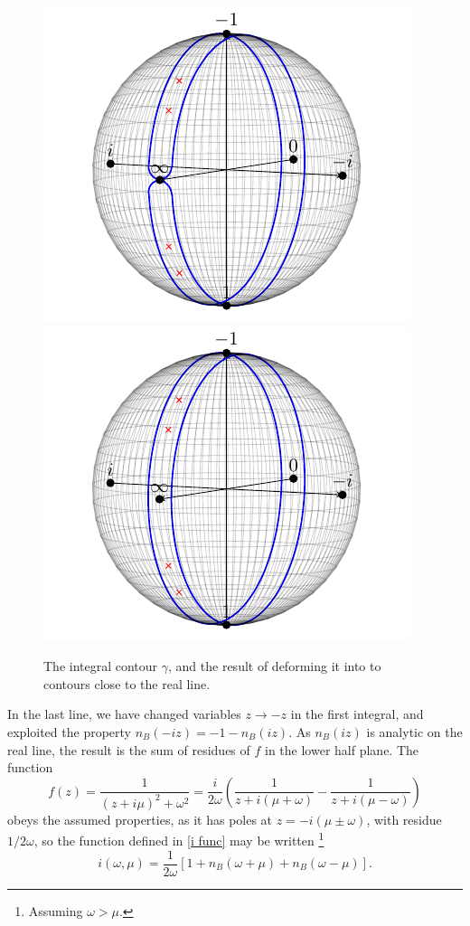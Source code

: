 \begin{figure}
    \centering
    \includegraphics{thermal_field_theory/plots/integral_cont.pdf}
    \includegraphics{thermal_field_theory/plots/integral_cont2.pdf}
    \caption{The integral contour $\gamma$, and the result of deforming it into to contours close to the real line.}
    \label{fig:integral contours}
\end{figure}
In the last line, we have changed variables $z \rightarrow -z$ in the first integral, and exploited the property $n_B(-i z) = -1 - n_B(iz)$.
As $n_B(iz)$ is analytic on the real line, the result is the sum of residues of $f$ in the lower half plane.
The function
\begin{equation}
    f(z) = \frac{1}{(z + i \mu)^2 + \omega^2} 
    = \frac{i}{2 \omega } 
    \left(
        \frac{1}{z + i(\mu + \omega)} - \frac{1}{z + i(\mu - \omega)}
    \right)
\end{equation}
obeys the assumed properties, as it has poles at
$z = - i (\mu \pm \omega)$, with residue $1 / 2 \omega$, so the function defined in \autoref{i func} may be written \footnote{Assuming $\omega>\mu$.}
\begin{equation}
    i(\omega, \mu) 
    = \frac{1}{2\omega}
    [1 + n_B(\omega + \mu) + n_B(\omega - \mu)].
\end{equation}

